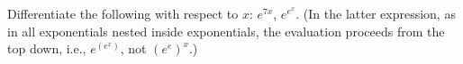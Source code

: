 Differentiate  the following with respect to $x$: $e^{7x}$, $e^{e^x}$. (In the latter expression,
as in all exponentials nested inside exponentials, the evaluation proceeds from the top down, i.e.,
$e^{(e^x)}$, not $(e^e)^x$.)
